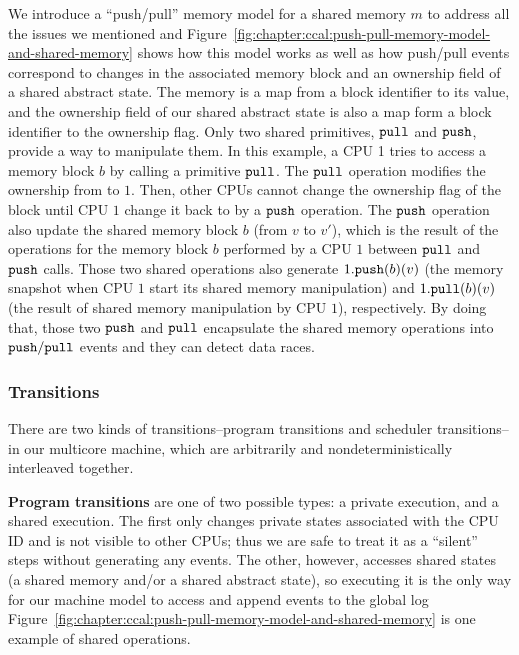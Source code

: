 We introduce a ``push/pull'' memory model for a shared memory $m$ to address all the issues we mentioned and 
Figure~\ref{fig:chapter:ccal:push-pull-memory-model-and-shared-memory} shows 
how this model works as well as how push/pull events correspond to changes in the associated memory block and an ownership field of a shared abstract state.
The memory is a map from a block identifier to its value,
and the ownership field of our shared abstract state is also a map form a block identifier to the ownership flag.
Only two shared primitives, ${\mathrm{\texttt{pull}}}$ and ${\mathrm{\texttt{push}}}$,
provide a way to manipulate them.
In this example, a CPU 1 tries to access a memory block $b$ by calling a primitive ${\mathrm{\texttt{pull}}}$. 
The ${\mathrm{\texttt{pull}}}$ operation modifies the ownership from  to  $1$. 
Then, other CPUs cannot change the ownership flag of the block until CPU $1$ change it back to  
by a ${\mathrm{\texttt{push}}}$ operation.
The ${\mathrm{\texttt{push}}}$ operation also update the shared memory block $b$ (from $v$ to $v'$), which is the result of the operations for the memory block $b$ performed by a CPU $1$  between ${\mathrm{\texttt{pull}}}$ and ${\mathrm{\texttt{push}}}$ calls. 
Those two shared operations also generate $1.{\mathrm{\texttt{push}}}(b)(v)$ (the memory snapshot when CPU $1$ start its shared memory manipulation) 
and  $1.{\mathrm{\texttt{pull}}}(b)(v)$ (the result of shared memory manipulation by CPU $1$), respectively.
By doing that, those two ${\mathrm{\texttt{push}}}$ and ${\mathrm{\texttt{pull}}}$ encapsulate the shared memory operations
into ${\mathrm{\texttt{push}}}/{\mathrm{\texttt{pull}}}$ events and they can detect data races.

\subsubsection{Transitions}

There are two kinds of transitions--program transitions and scheduler transitions--in our multicore machine,
which are arbitrarily and nondeterministically interleaved together.


\textbf{Program transitions} are one of two possible types:
a private execution, and a shared execution.
The first only changes private states associated with the CPU ID and is not visible to other CPUs;
thus we are safe to treat it as a ``silent'' steps without generating any events. 
The other, however, 
accesses shared states (a shared memory and/or a shared abstract state),
so executing it is  the only way for our machine model  to access and append events to the global log 
Figure~\ref{fig:chapter:ccal:push-pull-memory-model-and-shared-memory} is one example of shared operations.

